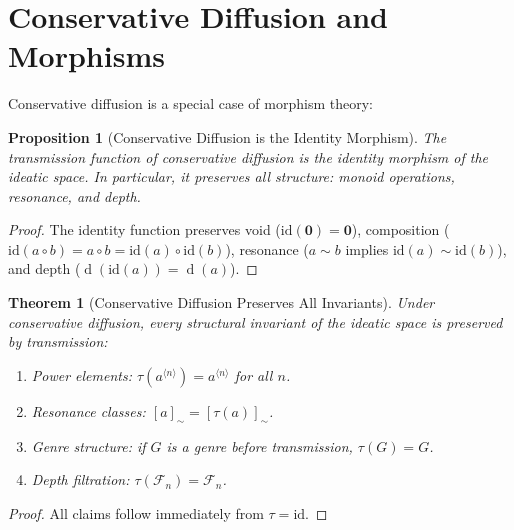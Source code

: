 \documentclass[11pt,openany]{book}
\theoremstyle{definition}
\theoremstyle{plain}
\newtheorem{theorem}[axiom]{Theorem}
\newtheorem{proposition}[axiom]{Proposition}
\theoremstyle{remark}
\newcommand{\compose}{\circ}                 %
\newcommand{\void}{\mathbf{0}}              %
\newcommand{\res}{\sim}                      %
\newcommand{\depth}{\operatorname{d}}       %
\newcommand{\transmit}{\tau}                 %
\newcommand{\compN}[2]{#1^{\langle #2 \rangle}} %
\newcommand{\Filt}[1]{\mathcal{F}_{#1}}     %
\begin{document}
\section{Conservative Diffusion and Morphisms}

Conservative diffusion is a special case of morphism theory:

\begin{proposition}[Conservative Diffusion is the Identity Morphism]
The transmission function of conservative diffusion is the identity morphism of the ideatic space. In particular, it preserves all structure: monoid operations, resonance, and depth.
\end{proposition}

\begin{proof}
The identity function preserves void ($\mathrm{id}(\void) = \void$), composition ($\mathrm{id}(a \compose b) = a \compose b = \mathrm{id}(a) \compose \mathrm{id}(b)$), resonance ($a \res b$ implies $\mathrm{id}(a) \res \mathrm{id}(b)$), and depth ($\depth(\mathrm{id}(a)) = \depth(a)$).
\end{proof}

\begin{theorem}[Conservative Diffusion Preserves All Invariants]
Under conservative diffusion, every structural invariant of the ideatic space is preserved by transmission:
\begin{enumerate}
\item Power elements: $\transmit(\compN{a}{n}) = \compN{a}{n}$ for all $n$.
\item Resonance classes: $[a]_\res = [\transmit(a)]_\res$.
\item Genre structure: if $G$ is a genre before transmission, $\transmit(G) = G$.
\item Depth filtration: $\transmit(\Filt{n}) = \Filt{n}$.
\end{enumerate}
\end{theorem}

\begin{proof}
All claims follow immediately from $\transmit = \mathrm{id}$.
\end{proof}
\end{document}
